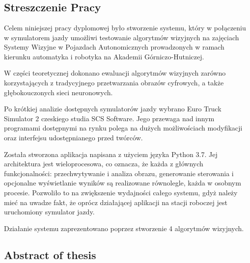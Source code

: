 \chapter*{ }
\section*{Streszczenie Pracy}


Celem niniejszej pracy dyplomowej było stworzenie systemu, który w połączeniu w symulatorem jazdy umożliwi testowanie algorytmów wizyjnych na zajęciach Systemy Wizyjne w Pojazdach Autonomicznych prowadzonych w ramach kierunku automatyka i robotyka na Akademii Górniczo-Hutniczej.

W części teoretycznej dokonano ewaluacji algorytmów wizyjnych zarówno korzystających z tradycyjnego przetwarzania obrazów cyfrowych, a także głębokouczonych sieci neuronowych. 

Po krótkiej analizie dostępnych symulatorów jazdy wybrano Euro Truck Simulator 2 czeskiego studia SCS Software. Jego przewaga nad innym programami dostępnymi na rynku polega na dużych możliwościach modyfikacji oraz interfejsu udostępnianego przed twórców.

Została stworzona aplikacja napisana z użyciem języka Python 3.7. Jej architektura jest wieloprocesowa, co oznacza, że każda z głównych funkcjonalności: przechwytywanie i analiza obrazu, generowanie sterowania i opcjonalne wyświetlanie wyników są realizowane równolegle, każda w osobnym procesie. Pozwoliło to na zwiększenie wydajności całego systemu, gdyż należy mieć na uwadze fakt, że oprócz działającej aplikacji na stacji roboczej jest uruchomiony symulator jazdy.
 
Działanie systemu zaprezentowano poprzez stworzenie 4 algorytmów wizyjnych.

\section*{Abstract of thesis}
